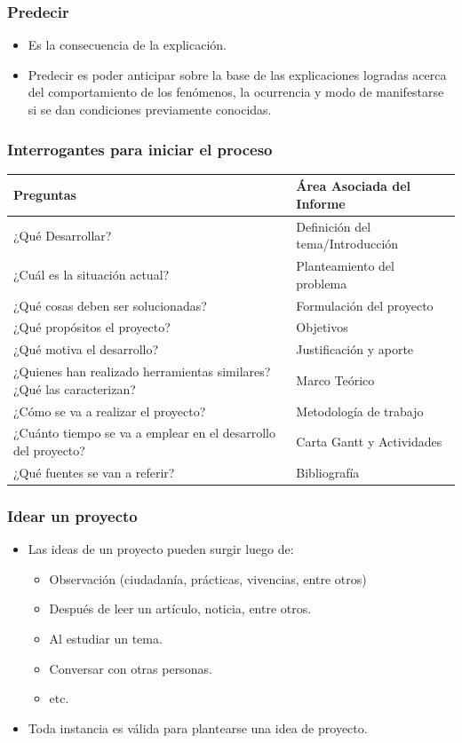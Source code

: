 \documentclass[aspectratio=169]{beamer}%
\begin{document}
\begin{frame}[fragile]
\frametitle{\textbf{Predecir}}
\justifying
\begin{itemize}
 \item Es la consecuencia de la explicación.
 \item Predecir es poder anticipar sobre la base de las explicaciones logradas acerca del comportamiento de los fenómenos, la ocurrencia y modo de manifestarse si se dan condiciones previamente conocidas.
\end{itemize}
\end{frame}

\begin{frame}[fragile]
\frametitle{\textbf{Interrogantes para iniciar el proceso}}
\justifying

\begin{center}
\begin{tabular}{|p{7cm}|p{7cm}|}
\hline
\textbf{Preguntas}&\textbf{Área Asociada del Informe}\\\hline
¿Qué Desarrollar?& Definición del tema/Introducción \\\hline
¿Cuál es la situación actual?&Planteamiento del problema \\\hline
¿Qué cosas deben ser solucionadas?&Formulación del proyecto \\\hline
¿Qué propósitos el proyecto?& Objetivos \\\hline
¿Qué motiva el desarrollo?&Justificación y aporte \\\hline
¿Quienes han realizado herramientas similares?¿Qué las caracterizan?& Marco Teórico \\\hline
¿Cómo se va a realizar el proyecto?&Metodología de trabajo\\\hline
¿Cuánto tiempo se va a emplear en el desarrollo del proyecto?& Carta Gantt y Actividades\\\hline
¿Qué fuentes se van a referir?&Bibliografía\\\hline
\end{tabular}
\end{center}
\end{frame}

\begin{frame}[fragile]
\frametitle{\textbf{Idear un proyecto}}
\justifying
\begin{itemize}
 \item Las ideas de un proyecto pueden surgir luego de:
\begin{itemize}
 \item Observación (ciudadanía, prácticas, vivencias, entre otros)
 \item Después de leer un artículo, noticia, entre otros.
 \item Al estudiar un tema.
 \item Conversar con otras personas.
 \item etc.
\end{itemize}
\item Toda instancia es válida para plantearse una idea de proyecto.
\end{itemize}
\end{frame}
\end{document}
